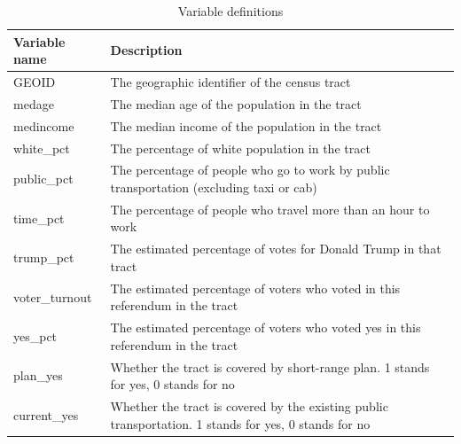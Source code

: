 \documentclass[
]{article}
\begin{document}
\begin{table}
\centering
\caption{Variable definitions}
\label{variableDefinitions}
\begin{tabular}{ll}
\hline
\hline
Variable name      & Description                                   \\
\hline
GEOID          & The geographic identifier of the census tract                 \\
medage        & The median age of the population in the tract               \\
medincome        & The median income of the population in the tract               \\
white\_pct           & The percentage of white population in the tract      \\
public\_pct          & The percentage of people who go to work by public transportation (excluding taxi or cab)      \\
time\_pct           & The percentage of people who travel more than an hour to work      \\
trump\_pct          & The estimated percentage of votes for Donald Trump in that tract      \\
voter\_turnout  & The estimated percentage of voters who voted in this referendum in the tract \\
yes\_pct           & The estimated percentage of voters who voted yes in this referendum in the tract      \\
plan\_yes          & Whether the tract is covered by short-range plan. 1 stands for yes, 0 stands for no      \\
current\_yes          & Whether the tract is covered by the existing public transportation. 1 stands for yes, 0 stands for no      \\
\hline
\end{tabular}
\end{table}
\end{document}
